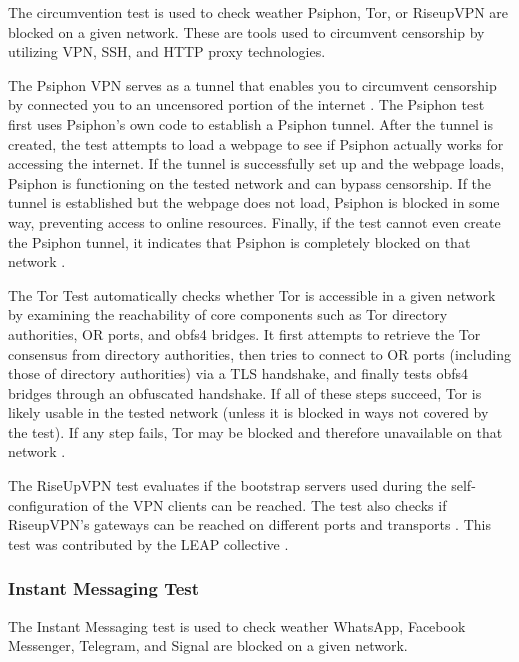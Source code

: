 The circumvention test is used to check weather Psiphon, Tor, or RiseupVPN are blocked on a given network. These are tools used to circumvent censorship by utilizing VPN, SSH, and HTTP proxy technologies. 

The Psiphon VPN serves as a tunnel that enables you to circumvent censorship by connected you to an uncensored portion of the internet \cite{ooniPsiphonTest}. The Psiphon test first uses Psiphon’s own code to establish a Psiphon tunnel. After the tunnel is created, the test attempts to load a webpage to see if Psiphon actually works for accessing the internet. If the tunnel is successfully set up and the webpage loads, Psiphon is functioning on the tested network and can bypass censorship. If the tunnel is established but the webpage does not load, Psiphon is blocked in some way, preventing access to online resources. Finally, if the test cannot even create the Psiphon tunnel, it indicates that Psiphon is completely blocked on that network \cite{PsiphonTestGitHub}.

The Tor Test \cite{TorTestABOUTOONI} automatically checks whether Tor is accessible in a given network by examining the reachability of core components such as Tor directory authorities, OR ports, and obfs4 bridges. It first attempts to retrieve the Tor consensus from directory authorities, then tries to connect to OR ports (including those of directory authorities) via a TLS handshake, and finally tests obfs4 bridges through an obfuscated handshake. If all of these steps succeed, Tor is likely usable in the tested network (unless it is blocked in ways not covered by the test). If any step fails, Tor may be blocked and therefore unavailable on that network \cite{TorTestGitHub}.

The RiseUpVPN test evaluates if the bootstrap servers used during the self-configuration of the VPN clients can be reached. The test also checks if RiseupVPN’s gateways can be reached on different ports and transports \cite{RiseUpVPNTest}. This test was contributed by the LEAP collective \cite{leapLEAPEncryption}.

\subsubsection{Instant Messaging Test}

The Instant Messaging test is used to check weather WhatsApp, Facebook Messenger, Telegram, and Signal are blocked on a given network.

